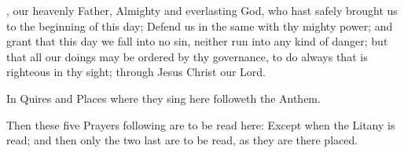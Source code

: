 , our heavenly Father, Almighty and everlasting God, who hast safely brought us to the beginning of this day; Defend us in the same with thy mighty power; and grant that this day we fall into no sin, neither run into any kind of danger; but that all our doings may be ordered by thy governance, to do always that is righteous in thy sight; through Jesus Christ our Lord.

\begin{rubric}
In Quires and Places where they sing here followeth the Anthem.
\end{rubric}

\newpage

\begin{rubric}
Then these five Prayers following are to be read here: Except when the Litany is read; and then only the two last are to be read, as they are there placed.
\end{rubric}



\newpage



\clearpage
